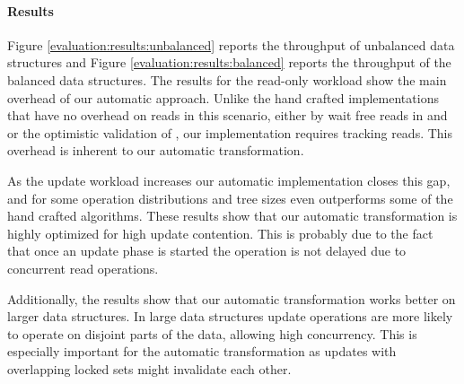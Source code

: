 \paragraph{Results} Figure \ref{evaluation:results:unbalanced} 
reports the throughput of unbalanced data structures and Figure 
\ref{evaluation:results:balanced} reports
the throughput of the balanced data structures. 
The results for the read-only workload show the main overhead
of our automatic approach. Unlike the hand crafted implementations
that have no overhead on reads in this scenario, either by wait free reads in
\danaTree and \danaAVL or the optimistic validation of \bronson, 
our implementation requires tracking reads. This overhead is 
inherent to our automatic transformation.
 
As the update workload increases our automatic implementation 
closes this gap, and for some operation distributions and 
tree sizes even outperforms some of the hand crafted algorithms.
These results show that our automatic transformation is highly optimized for
high update contention. This is probably due to the fact that once
an update phase is started the operation is not delayed due to concurrent 
read operations. 

Additionally, the results show that our automatic transformation 
works better on larger data structures. In large data structures 
update operations are more likely to operate on disjoint parts of 
the data, allowing high concurrency. This is especially important 
for the automatic transformation as updates  with overlapping 
locked sets might invalidate each other.  
 


\begin{figure*}
\begin{center}

\end{center}
\caption{Throughput of unbalanced data
structures.
\label{evaluation:results:unbalanced}}
\end{figure*}


\begin{figure*}
\begin{center}



\end{center}
\caption{Throughput of balanced data
structures.
\label{evaluation:results:balanced}}
\end{figure*}